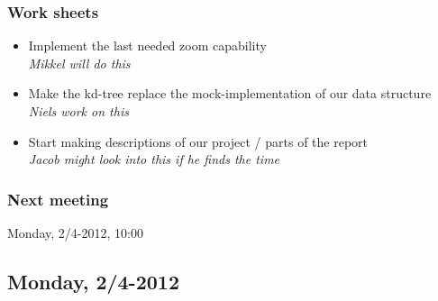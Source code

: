 \documentclass[a4paper,11pt]{article}
\begin{document}
\subsubsection*{Work sheets}
\begin{itemize}
	\item Implement the last needed zoom capability \\
		\textsl{Mikkel will do this}
	\item Make the kd-tree replace the mock-implementation of our data structure \\
		\textsl{Niels work on this}
	\item Start making descriptions of our project / parts of the report \\
		\textsl{Jacob might look into this if he finds the time}
\end{itemize}

\subsubsection*{Next meeting}
Monday, 2/4-2012, 10:00


\pagebreak
\subsection{Monday, 2/4-2012}
\end{document}
